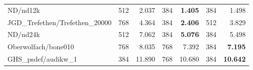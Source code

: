 \begin{tabular}{l|rr|rr|rr}
  ND/nd12k                        & 512                              & 2.037                      & 384  & \bf 1.405 & 384 & 1.498      \\
  JGD\_Trefethen/Trefethen\_20000 & 768                              & 4.364                      & 384  & \bf 2.406 & 512 & 3.829      \\
  ND/nd24k                        & 512                              & 7.062                      & 384  & \bf 5.076 & 384 & 5.498      \\
  Oberwolfach/bone010             & 768                              & 8.035                      & 768  & 7.392     & 384 & \bf 7.195  \\
  GHS\_psdef/audikw\_1            & 384                              & 11.890                     & 768  & 10.680    & 384 & \bf 10.642 \\
  \hline
\end{tabular}
